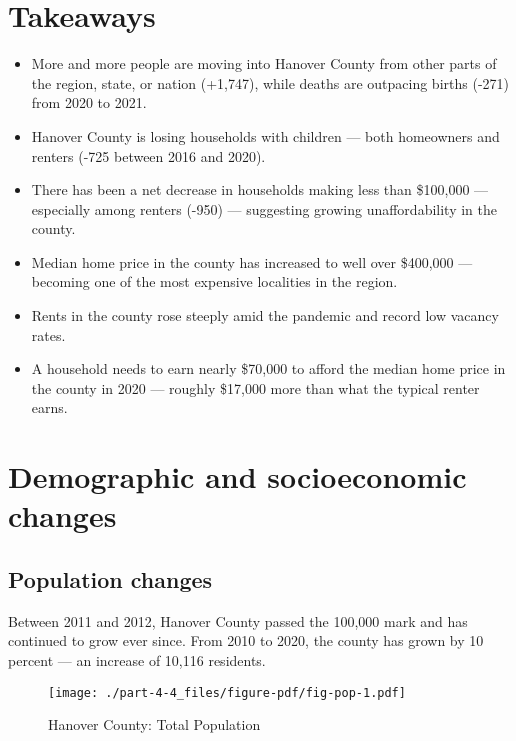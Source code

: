 \documentclass[
  letterpaper,
  DIV=11,
  numbers=noendperiod]{scrreprt}
\providecommand{\tightlist}{%
  \setlength{\itemsep}{0pt}\setlength{\parskip}{0pt}}\usepackage{longtable,booktabs,array}
\begin{document}
\hypertarget{takeaways-3}{%
\section{Takeaways}\label{takeaways-3}}

\begin{itemize}
\tightlist
\item
  More and more people are moving into Hanover County from other parts
  of the region, state, or nation (+1,747), while deaths are outpacing
  births (-271) from 2020 to 2021.
\item
  Hanover County is losing households with children --- both homeowners
  and renters (-725 between 2016 and 2020).
\item
  There has been a net decrease in households making less than \$100,000
  --- especially among renters (-950) --- suggesting growing
  unaffordability in the county.
\item
  Median home price in the county has increased to well over \$400,000
  --- becoming one of the most expensive localities in the region.
\item
  Rents in the county rose steeply amid the pandemic and record low
  vacancy rates.
\item
  A household needs to earn nearly \$70,000 to afford the median home
  price in the county in 2020 --- roughly \$17,000 more than what the
  typical renter earns.
\end{itemize}

\hypertarget{demographic-and-socioeconomic-changes-3}{%
\section{Demographic and socioeconomic
changes}\label{demographic-and-socioeconomic-changes-3}}

\hypertarget{population-changes-3}{%
\subsection{Population changes}\label{population-changes-3}}

Between 2011 and 2012, Hanover County passed the 100,000 mark and has
continued to grow ever since. From 2010 to 2020, the county has grown by
10 percent --- an increase of 10,116 residents.

\begin{figure}

{\centering \texttt{[image: ./part-4-4\_files/figure-pdf/fig-pop-1.pdf]}

}

\caption{\label{fig-pop}Hanover County: Total Population}

\end{figure}
\end{document}
